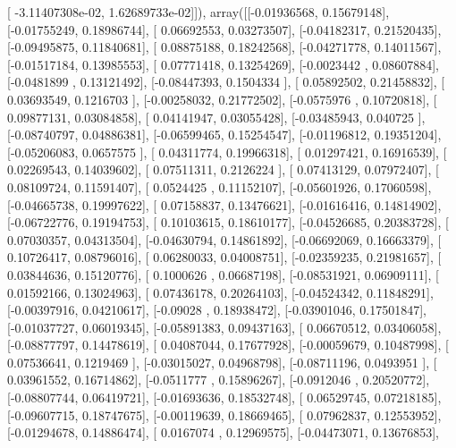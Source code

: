 \documentclass{article}
\begin{document}
       [ -3.11407308e-02,   1.62689733e-02]]), array([[-0.01936568,  0.15679148],
       [-0.01755249,  0.18986744],
       [ 0.06692553,  0.03273507],
       [-0.04182317,  0.21520435],
       [-0.09495875,  0.11840681],
       [ 0.08875188,  0.18242568],
       [-0.04271778,  0.14011567],
       [-0.01517184,  0.13985553],
       [ 0.07771418,  0.13254269],
       [-0.0023442 ,  0.08607884],
       [-0.0481899 ,  0.13121492],
       [-0.08447393,  0.1504334 ],
       [ 0.05892502,  0.21458832],
       [ 0.03693549,  0.1216703 ],
       [-0.00258032,  0.21772502],
       [-0.0575976 ,  0.10720818],
       [ 0.09877131,  0.03084858],
       [ 0.04141947,  0.03055428],
       [-0.03485943,  0.040725  ],
       [-0.08740797,  0.04886381],
       [-0.06599465,  0.15254547],
       [-0.01196812,  0.19351204],
       [-0.05206083,  0.0657575 ],
       [ 0.04311774,  0.19966318],
       [ 0.01297421,  0.16916539],
       [ 0.02269543,  0.14039602],
       [ 0.07511311,  0.2126224 ],
       [ 0.07413129,  0.07972407],
       [ 0.08109724,  0.11591407],
       [ 0.0524425 ,  0.11152107],
       [-0.05601926,  0.17060598],
       [-0.04665738,  0.19997622],
       [ 0.07158837,  0.13476621],
       [-0.01616416,  0.14814902],
       [-0.06722776,  0.19194753],
       [ 0.10103615,  0.18610177],
       [-0.04526685,  0.20383728],
       [ 0.07030357,  0.04313504],
       [-0.04630794,  0.14861892],
       [-0.06692069,  0.16663379],
       [ 0.10726417,  0.08796016],
       [ 0.06280033,  0.04008751],
       [-0.02359235,  0.21981657],
       [ 0.03844636,  0.15120776],
       [ 0.1000626 ,  0.06687198],
       [-0.08531921,  0.06909111],
       [ 0.01592166,  0.13024963],
       [ 0.07436178,  0.20264103],
       [-0.04524342,  0.11848291],
       [-0.00397916,  0.04210617],
       [-0.09028   ,  0.18938472],
       [-0.03901046,  0.17501847],
       [-0.01037727,  0.06019345],
       [-0.05891383,  0.09437163],
       [ 0.06670512,  0.03406058],
       [-0.08877797,  0.14478619],
       [ 0.04087044,  0.17677928],
       [-0.00059679,  0.10487998],
       [ 0.07536641,  0.1219469 ],
       [-0.03015027,  0.04968798],
       [-0.08711196,  0.0493951 ],
       [ 0.03961552,  0.16714862],
       [-0.0511777 ,  0.15896267],
       [-0.0912046 ,  0.20520772],
       [-0.08807744,  0.06419721],
       [-0.01693636,  0.18532748],
       [ 0.06529745,  0.07218185],
       [-0.09607715,  0.18747675],
       [-0.00119639,  0.18669465],
       [ 0.07962837,  0.12553952],
       [-0.01294678,  0.14886474],
       [ 0.0167074 ,  0.12969575],
       [-0.04473071,  0.13676853],
\end{document}
